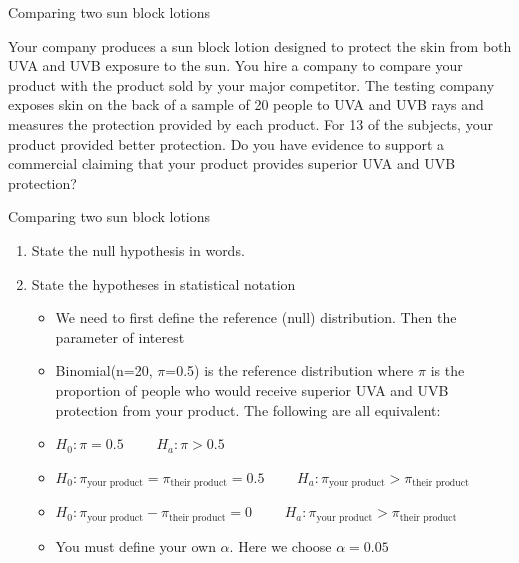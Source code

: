 \documentclass[handout]{beamer}\usepackage[]{graphicx}\usepackage[]{color}
\begin{document}
\begin{frame}{Comparing two sun block lotions}

\begin{example}
	Your company produces a sun block lotion designed to protect the skin from both UVA and UVB exposure to the sun. You hire a company to compare your product with the product sold by your major competitor. The testing company exposes skin on the back of a sample of 20 people to UVA and UVB rays and measures the protection provided by each product. For 13 of the subjects, your product provided better protection. Do you have evidence to support a commercial claiming that your product provides superior UVA and UVB protection?
\end{example}


\end{frame}



\begin{frame}[fragile]{Comparing two sun block lotions}
\small
\begin{enumerate}
	\setlength\itemsep{1em}
	\item State the null hypothesis in words. \pause
	\item State the hypotheses in statistical notation \pause
	\begin{itemize}
			\setlength\itemsep{.71em}
		\item We need to first define the reference (null) distribution. Then the parameter of interest \pause
		\item Binomial(n=20, $\pi$=0.5) is the reference distribution where $\pi$ is the proportion of people who would receive superior UVA and UVB protection from your product. \pause
		The following are all equivalent: 
		\item[] $H_0: \pi = 0.5 \qquad$ $H_a: \pi > 0.5$ \pause
		\item[] $H_0: \pi_{\textrm{your product}}=\pi_{\textrm{their product}} = 0.5 \qquad$ $H_a: \pi_{\textrm{your product}} > \pi_{\textrm{their product}}$ \pause
		\item[] $H_0: \pi_{\textrm{your product}}-\pi_{\textrm{their product}} = 0 \qquad$ $H_a: \pi_{\textrm{your product}} > \pi_{\textrm{their product}}$ \pause
		\item You must define your own $\alpha$. Here we choose $\alpha=0.05$ 		
	\end{itemize}
      
 
\end{enumerate}

\end{frame}
\end{document}
